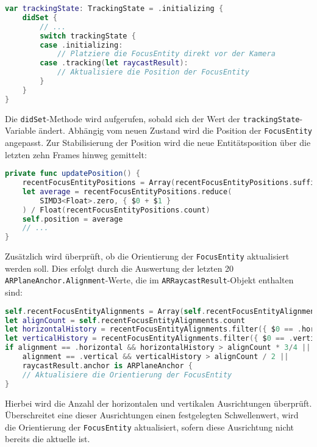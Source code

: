 \begin{lstlisting}[language=Swift]
var trackingState: TrackingState = .initializing {
    didSet {
        // ...
        switch trackingState {
        case .initializing:
            // Platziere die FocusEntity direkt vor der Kamera
        case .tracking(let raycastResult):
            // Aktualisiere die Position der FocusEntity
        }
    }
}
\end{lstlisting}

Die \texttt{didSet}-Methode wird aufgerufen, sobald sich der Wert der \texttt{trackingState}-Variable ändert. Abhängig vom neuen Zustand wird die Position der \texttt{FocusEntity} angepasst. Zur Stabilisierung der Position wird die neue Entitätsposition über die letzten zehn Frames hinweg gemittelt:

\begin{lstlisting}[language=Swift]
private func updatePosition() {
    recentFocusEntityPositions = Array(recentFocusEntityPositions.suffix(10))
    let average = recentFocusEntityPositions.reduce(
        SIMD3<Float>.zero, { $0 + $1 }
    ) / Float(recentFocusEntityPositions.count)
    self.position = average
    // ...
}
\end{lstlisting}

Zusätzlich wird überprüft, ob die Orientierung der \texttt{FocusEntity} aktualisiert werden soll. Dies erfolgt durch die Auswertung der letzten 20 \texttt{ARPlaneAnchor.Alignment}-Werte, die im \texttt{ARRaycastResult}-Objekt enthalten sind:

\begin{lstlisting}[language=Swift]
self.recentFocusEntityAlignments = Array(self.recentFocusEntityAlignments.suffix(20))
let alignCount = self.recentFocusEntityAlignments.count
let horizontalHistory = recentFocusEntityAlignments.filter({ $0 == .horizontal }).count
let verticalHistory = recentFocusEntityAlignments.filter({ $0 == .vertical }).count
if alignment == .horizontal && horizontalHistory > alignCount * 3/4 ||
    alignment == .vertical && verticalHistory > alignCount / 2 ||
    raycastResult.anchor is ARPlaneAnchor {
    // Aktualisiere die Orientierung der FocusEntity
}
\end{lstlisting}

Hierbei wird die Anzahl der horizontalen und vertikalen Ausrichtungen überprüft. Überschreitet eine dieser Ausrichtungen einen festgelegten Schwellenwert, wird die Orientierung der \texttt{FocusEntity} aktualisiert, sofern diese Ausrichtung nicht bereits die aktuelle ist.

